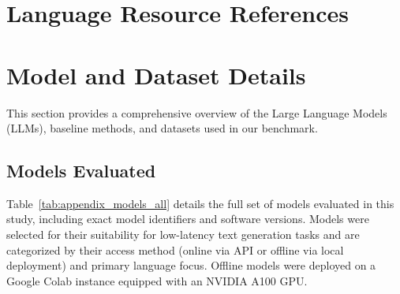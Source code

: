 \documentclass[10pt, a4paper]{article}
\begin{document}
\section{Language Resource References}
\vspace{-1em}


\appendix
\section{Model and Dataset Details}
\label{appendix:models_datasets}

This section provides a comprehensive overview of the Large Language Models (LLMs), baseline methods, and datasets used in our benchmark.

\subsection{Models Evaluated}
Table~\ref{tab:appendix_models_all} details the full set of models evaluated in this study, including exact model identifiers and software versions. Models were selected for their suitability for low-latency text generation tasks and are categorized by their access method (online via API or offline via local deployment) and primary language focus. Offline models were deployed on a Google Colab instance equipped with an NVIDIA A100 GPU.
\end{document}
